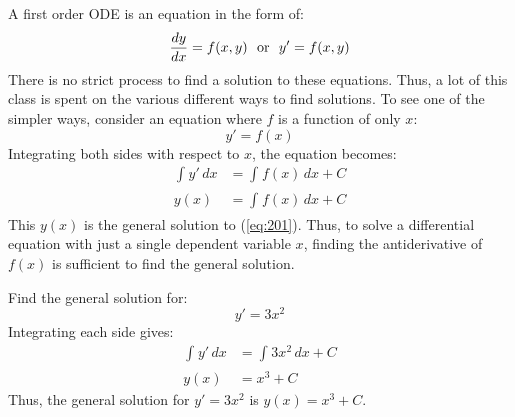 \documentclass[12pt]{article}
\begin{document}
A first order ODE is an equation in the form of:
\begin{equation}
  \frac{dy}{dx} = f(x,y) \ \ \textup{or} \ \ y' = f(x,y)
  \label{eq:201}
\end{equation}
There is no strict process to find a solution to these equations. Thus, a lot of this class is spent on the various different ways to find solutions. To see one of the simpler ways, consider an equation where $f$ is a function of only $x$:
\begin{equation*}
  y' = f(x)
\end{equation*}
Integrating both sides with respect to $x$, the equation becomes:
\begin{align*}
  \int_{}^{} y' \, dx &= \int_{}^{} f(x) \, dx + C \\
  y(x) &= \int_{}^{} f(x) \, dx + C
\end{align*}
This $y(x)$ is the general solution to (\ref{eq:201}). Thus, to solve a differential equation with just a single dependent variable $x$, finding the antiderivative of $f(x)$ is sufficient to find the general solution.
\begin{example}
  Find the general solution for:
  \begin{equation*}
    y' = 3x^2
  \end{equation*}
  Integrating each side gives:
  \begin{align*}
    \int_{}^{} y' \, dx &= \int_{}^{} 3x^2 \, dx + C \\
    y(x) &= x^3 + C
  \end{align*}
  Thus, the general solution for $y' = 3x^2$ is $y(x) = x^3 + C$.
\end{example}
\end{document}
